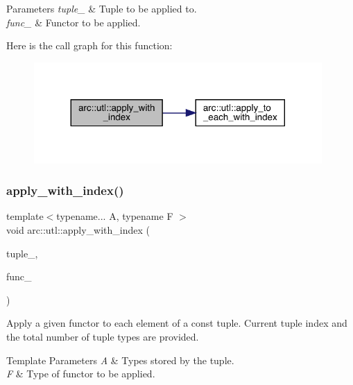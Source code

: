 \begin{DoxyParams}{Parameters}
{\em tuple\+\_\+} & Tuple to be applied to. \\
\hline
{\em func\+\_\+} & Functor to be applied. \\
\hline
\end{DoxyParams}
Here is the call graph for this function\+:\nopagebreak
\begin{figure}[H]
\begin{center}
\leavevmode
\includegraphics[width=311pt]{namespacearc_1_1utl_a2658c84859917c434ff3a7f667b21eca_cgraph}
\end{center}
\end{figure}
\mbox{\label{namespacearc_1_1utl_ae57e12a4fd6beeb3a1a40bfd461c3a87}} 
\subsubsection{\texorpdfstring{apply\+\_\+with\+\_\+index()}{apply\_with\_index()}\hspace{0.1cm}{\footnotesize\ttfamily [6/6]}}
{\footnotesize\ttfamily template$<$typename... A, typename F $>$ \\
void arc\+::utl\+::apply\+\_\+with\+\_\+index (\begin{DoxyParamCaption}\item[{const std\+::tuple$<$ A... $>$ \&}]{tuple\+\_\+,  }\item[{F}]{func\+\_\+ }\end{DoxyParamCaption})}

Apply a given functor to each element of a const tuple. Current tuple index and the total number of tuple types are provided.


\begin{DoxyTemplParams}{Template Parameters}
{\em A} & Types stored by the tuple. \\
\hline
{\em F} & Type of functor to be applied.\\
\hline
\end{DoxyTemplParams}


